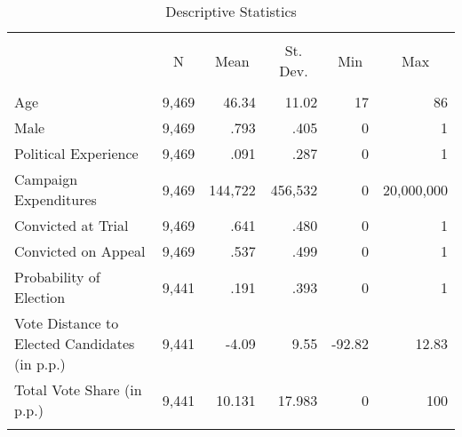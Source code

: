
\begin{table}[!htbp] \centering
  \caption{Descriptive Statistics}
  \label{tab:sumstats}
\scriptsize
\begin{tabular}{@{\extracolsep{2pt}}lrrrrr}
\\[-1.8ex]\hline
\hline \\[-1.8ex]
& \multicolumn{1}{c}{N} & \multicolumn{1}{c}{Mean} & \multicolumn{1}{c}{St. Dev.} & \multicolumn{1}{c}{Min} & \multicolumn{1}{c}{Max} \\
\hline \\[-1.8ex]
Age                                           & 9,469 & 46.34 & 11.02 & 17 & 86 \\
Male                                          & 9,469 & .793 & .405 & 0 & 1 \\
Political Experience                          & 9,469 & .091 & .287 & 0 & 1 \\
Campaign Expenditures                         & 9,469 & 144,722 & 456,532 & 0 & 20,000,000 \\
Convicted at Trial                            & 9,469 & .641 & .480 & 0 & 1 \\
Convicted on Appeal                           & 9,469 & .537 & .499 & 0 & 1 \\
Probability of Election                       & 9,441 & .191 & .393 & 0 & 1 \\
Vote Distance to Elected Candidates (in p.p.) & 9,441 & -4.09 & 9.55 & -92.82 & 12.83 \\
Total Vote Share (in p.p.)                    & 9,441 & 10.131 & 17.983 & 0 & 100 \\
\hline
\hline \\[-1.8ex]
\end{tabular}
\end{table}
